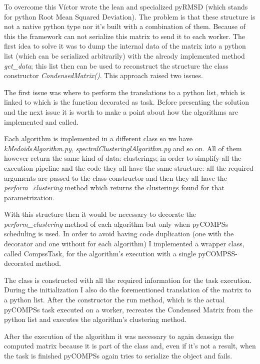 To overcome this Víctor wrote the lean and specialized pyRMSD (which stands for python Root Mean Squared Deviation). The problem is that these structure is not a native python type nor it's built with a combination of them. Because of this the framework can not serialize this matrix to send it to each worker. The first idea to solve it was to dump the internal data of the matrix into a python list (which can be serialized arbitrarily) with the already implemented method \textit{get\_data}; this list then can be used to reconstruct the structure the class constructor \textit{CondensedMatrix()}. This approach raised two issues. 

The first issue was where to perform the translations to a python list, which is linked to which is the function decorated as task. Before presenting the solution and the next issue it is worth to make a point about how the algorithms are implemented and called. 

Each algorithm is implemented in a different class so we have \textit{kMedoidsAlgorithm.py}, \textit{spectralClusteringlAlgorithm.py} and so on. All of them however return the same kind of data: clusterings; in order to simplify all the execution pipeline and the code they all have the same structure: all the required arguments are passed to the class constructor and then they all have the \textit{perform\_clustering} method which returns the clusterings found for that parametrization. 

With this structure then it would be necessary to decorate the \textit{perform\_clustering} method of each algorithm but only when pyCOMPSs scheduling is used. In order to avoid having code duplication (one with the decorator and one without for each algorithm) I implemented a wrapper class, called CompssTask, for the algorithm's execution with a single pyCOMPSS-decorated method.

The class is constructed with all the required information for the task execution. During the initialization I also do the forementioned translation of the matrix to a python list. After the constructor the run method, which is the actual pyCOMPSs task executed on a worker, recreates the Condensed Matrix from the python list and executes the algorithm's clustering method. 

After the execution of the algorithm it was necessary to again deassign the computed matrix because it is part of the class and, even if it's not a result, when the task is finished pyCOMPSs again tries to serialize the object and fails.

